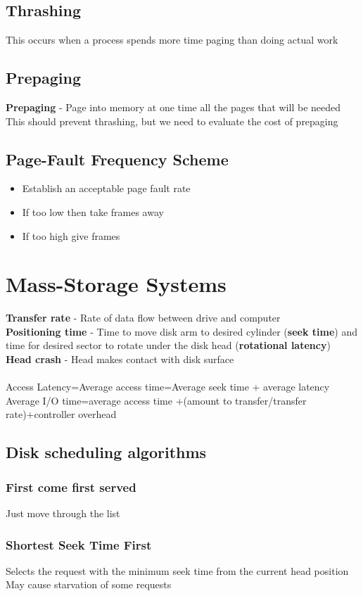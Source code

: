 \documentclass{article}[18pt]
\begin{document}
\subsection{Thrashing}
This occurs when a process spends more time paging than doing actual work
\subsection{Prepaging}
\textbf{Prepaging} - Page into memory at one time all the pages that will be needed\\
This should prevent thrashing, but we need to evaluate the cost of prepaging
\subsection{Page-Fault Frequency Scheme}
\begin{itemize}
	\item Establish an acceptable page fault rate
	\item If too low then take frames away
	\item If too high give frames 
\end{itemize}
\section{Mass-Storage Systems}
\textbf{Transfer rate} - Rate of data flow between drive and computer\\
\textbf{Positioning time} - Time to move disk arm to desired cylinder (\textbf{seek time}) and time for desired sector to rotate under the disk head (\textbf{rotational latency})\\
\textbf{Head crash} - Head makes contact with disk surface\\
\\
Access Latency=Average access time=Average seek time + average latency\\
Average I/O time=average access time +(amount to transfer/transfer rate)+controller overhead 
\subsection{Disk scheduling algorithms}
\subsubsection{First come first served}
Just move through the list
\subsubsection{Shortest Seek Time First}
Selects the request with the minimum seek time from the current head position
May cause starvation of some requests
\end{document}

